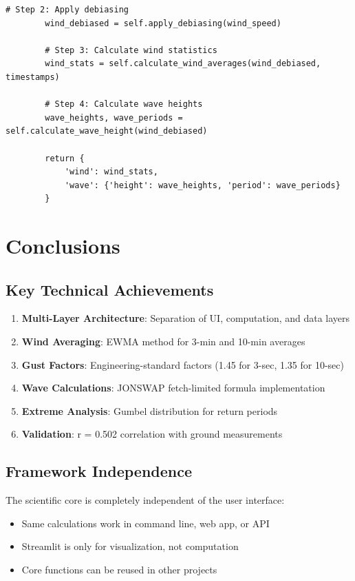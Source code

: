 \documentclass[12pt]{article}
\begin{document}
\begin{lstlisting}[caption=Complete Analysis Pipeline]
        # Step 2: Apply debiasing
        wind_debiased = self.apply_debiasing(wind_speed)
        
        # Step 3: Calculate wind statistics
        wind_stats = self.calculate_wind_averages(wind_debiased, timestamps)
        
        # Step 4: Calculate wave heights
        wave_heights, wave_periods = self.calculate_wave_height(wind_debiased)
        
        return {
            'wind': wind_stats,
            'wave': {'height': wave_heights, 'period': wave_periods}
        }
\end{lstlisting}

\newpage

\section{Conclusions}

\subsection{Key Technical Achievements}

\begin{enumerate}
    \item \textbf{Multi-Layer Architecture}: Separation of UI, computation, and data layers
    \item \textbf{Wind Averaging}: EWMA method for 3-min and 10-min averages
    \item \textbf{Gust Factors}: Engineering-standard factors (1.45 for 3-sec, 1.35 for 10-sec)
    \item \textbf{Wave Calculations}: JONSWAP fetch-limited formula implementation
    \item \textbf{Extreme Analysis}: Gumbel distribution for return periods
    \item \textbf{Validation}: r = 0.502 correlation with ground measurements
\end{enumerate}

\subsection{Framework Independence}

The scientific core is completely independent of the user interface:

\begin{itemize}
    \item Same calculations work in command line, web app, or API
    \item Streamlit is only for visualization, not computation
    \item Core functions can be reused in other projects
\end{itemize}
\end{document}
